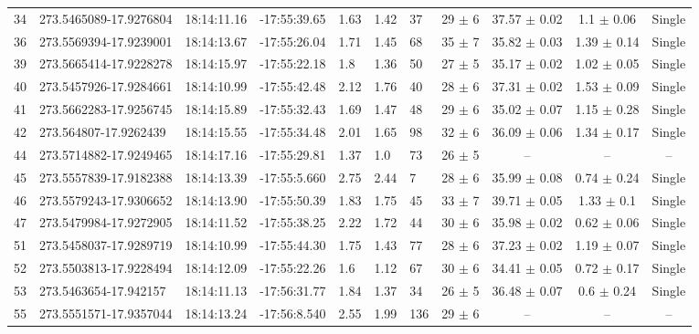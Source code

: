 \documentclass[longauth]{aa} %
\begin{document}
\begin{appendix}
\begin{table}[htbp!]
\begin{tabular}{llllllllccc}
34  &  273.5465089-17.9276804  &  18:14:11.16  &  -17:55:39.65  &  1.63  &  1.42  &  37  &  29 $\pm$ 6  &  37.57 $\pm$ 0.02  &  1.1 $\pm$ 0.06  &  Single \\
36  &  273.5569394-17.9239001  &  18:14:13.67  &  -17:55:26.04  &  1.71  &  1.45  &  68  &  35 $\pm$ 7  &  35.82 $\pm$ 0.03  &  1.39 $\pm$ 0.14  &  Single \\
39  &  273.5665414-17.9228278  &  18:14:15.97  &  -17:55:22.18  &  1.8  &  1.36  &  50  &  27 $\pm$ 5  &  35.17 $\pm$ 0.02  &  1.02 $\pm$ 0.05  &  Single \\
40  &  273.5457926-17.9284661  &  18:14:10.99  &  -17:55:42.48  &  2.12  &  1.76  &  40  &  28 $\pm$ 6  &  37.31 $\pm$ 0.02  &  1.53 $\pm$ 0.09  &  Single \\
41  &  273.5662283-17.9256745  &  18:14:15.89  &  -17:55:32.43  &  1.69  &  1.47  &  48  &  29 $\pm$ 6  &  35.02 $\pm$ 0.07  &  1.15 $\pm$ 0.28  &  Single \\
42  &  273.564807-17.9262439  &  18:14:15.55  &  -17:55:34.48  &  2.01  &  1.65  &  98  &  32 $\pm$ 6  &  36.09 $\pm$ 0.06  &  1.34 $\pm$ 0.17  &  Single \\
44  &  273.5714882-17.9249465  &  18:14:17.16  &  -17:55:29.81  &  1.37  &  1.0  &  73  &  26 $\pm$ 5  &  --  &  --  &  -- \\
45  &  273.5557839-17.9182388  &  18:14:13.39  &  -17:55:5.660  &  2.75  &  2.44  &  7  &  28 $\pm$ 6  &  35.99 $\pm$ 0.08  &  0.74 $\pm$ 0.24  &  Single \\
46  &  273.5579243-17.9306652  &  18:14:13.90  &  -17:55:50.39  &  1.83  &  1.75  &  45  &  33 $\pm$ 7  &  39.71 $\pm$ 0.05  &  1.33 $\pm$ 0.1  &  Single \\
47  &  273.5479984-17.9272905  &  18:14:11.52  &  -17:55:38.25  &  2.22  &  1.72  &  44  &  30 $\pm$ 6  &  35.98 $\pm$ 0.02  &  0.62 $\pm$ 0.06  &  Single \\
51  &  273.5458037-17.9289719  &  18:14:10.99  &  -17:55:44.30  &  1.75  &  1.43  &  77  &  28 $\pm$ 6  &  37.23 $\pm$ 0.02  &  1.19 $\pm$ 0.07  &  Single \\
52  &  273.5503813-17.9228494  &  18:14:12.09  &  -17:55:22.26  &  1.6  &  1.12  &  67  &  30 $\pm$ 6  &  34.41 $\pm$ 0.05  &  0.72 $\pm$ 0.17  &  Single \\
53  &  273.5463654-17.942157  &  18:14:11.13  &  -17:56:31.77  &  1.84  &  1.37  &  34  &  26 $\pm$ 5  &  36.48 $\pm$ 0.07  &  0.6 $\pm$ 0.24  &  Single \\
55  &  273.5551571-17.9357044  &  18:14:13.24  &  -17:56:8.540  &  2.55  &  1.99  &  136  &  29 $\pm$ 6  &  --  &  --  &  -- \\

\end{tabular}
\end{table}
\end{appendix}
\end{document}

